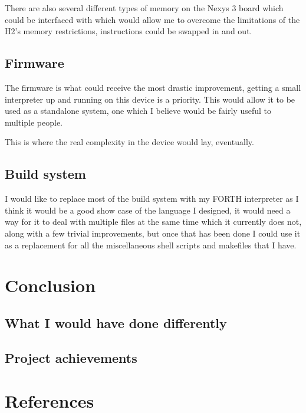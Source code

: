 \documentclass	[a4paper, 10pt]	{article}
\begin{document}
      There are also several different types of memory on the Nexys 3 board
      which could be interfaced with which would allow me to overcome the
      limitations of the H2's memory restrictions, instructions could be swapped
      in and out.

    \subsection{Firmware}

    The firmware is what could receive the most drastic improvement, getting a small
    interpreter up and running on this device is a priority. This would allow it
    to be used as a standalone system, one which I believe would be fairly useful
    to multiple people. 

    This is where the real complexity in the device would lay, eventually.

    \subsection{Build system}

    I would like to replace most of the build system with my FORTH interpreter as I
    think it would be a good show case of the language I designed, it would need
    a way for it to deal with multiple files at the same time which it currently does
    not, along with a few trivial improvements, but once that has been done I could
    use it as a replacement for all the miscellaneous shell scripts and makefiles
    that I have.

  \section{Conclusion}
    \subsection{What I would have done differently}
    \subsection{Project achievements}
  \section{References}
\end{document}
